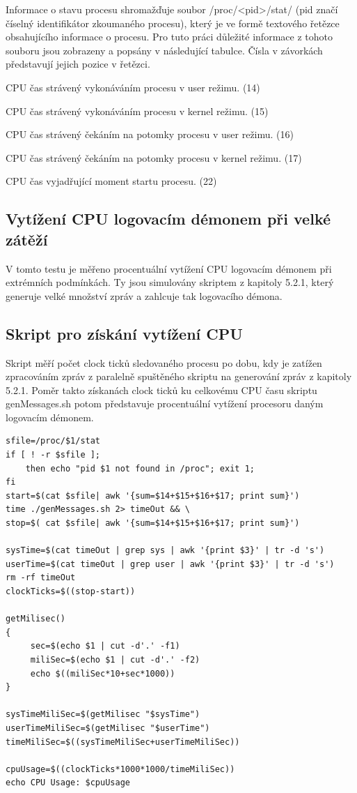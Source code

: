 \documentclass[thesis=B,czech]{FITthesis}[2012/06/26]
\begin{document}
Informace o stavu procesu shromažďuje soubor /proc/<pid>/stat/ (pid značí číselný identifikátor zkoumaného procesu), který je ve formě textového řetězce obsahujícího informace o procesu. Pro tuto práci důležité informace z tohoto souboru jsou zobrazeny a popsány v následující tabulce. Čísla v závorkách představují jejich pozice v řetězci.

\begin{description}
\setlength\itemsep{-1ex}
	\item [utime:] CPU čas strávený vykonáváním procesu v user režimu. (14)
	\item [stime:] CPU čas strávený vykonáváním procesu v kernel režimu. (15)
	\item [cutime:] CPU čas strávený čekáním na potomky procesu v user režimu. (16)
	\item [cstime:] CPU čas strávený čekáním na potomky procesu v kernel režimu. (17)
	\item [starttime:] CPU čas vyjadřující moment startu procesu. (22)
\end{description}

\subsection{Vytížení CPU logovacím démonem při velké zátěží}
V tomto testu je měřeno procentuální vytížení CPU logovacím démonem při extrémních podmínkách. Ty jsou simulovány skriptem z kapitoly 5.2.1, který generuje velké množství zpráv a zahlcuje tak logovacího démona. 

\subsection*{Skript pro získání vytížení CPU}
Skript měří počet clock ticků sledovaného procesu po dobu, kdy je zatížen zpracováním zpráv z paralelně spuštěného skriptu na generování zpráv z kapitoly 5.2.1. Poměr takto získanách clock ticků ku celkovému CPU času skriptu genMessages.sh potom představuje procentuální vytížení procesoru daným logovacím démonem.

\begin{lstlisting}[style=AshStyle]
sfile=/proc/$1/stat
if [ ! -r $sfile ];
	then echo "pid $1 not found in /proc"; exit 1;
fi
start=$(cat $sfile| awk '{sum=$14+$15+$16+$17; print sum}')
time ./genMessages.sh 2> timeOut && \
stop=$( cat $sfile| awk '{sum=$14+$15+$16+$17; print sum}')

sysTime=$(cat timeOut | grep sys | awk '{print $3}' | tr -d 's')
userTime=$(cat timeOut | grep user | awk '{print $3}' | tr -d 's')
rm -rf timeOut
clockTicks=$((stop-start))

getMilisec()
{
	 sec=$(echo $1 | cut -d'.' -f1)
	 miliSec=$(echo $1 | cut -d'.' -f2)
	 echo $((miliSec*10+sec*1000))
}

sysTimeMiliSec=$(getMilisec "$sysTime")
userTimeMiliSec=$(getMilisec "$userTime")
timeMiliSec=$((sysTimeMiliSec+userTimeMiliSec))

cpuUsage=$((clockTicks*1000*1000/timeMiliSec))
echo CPU Usage: $cpuUsage
\end{lstlisting}
\end{document}

